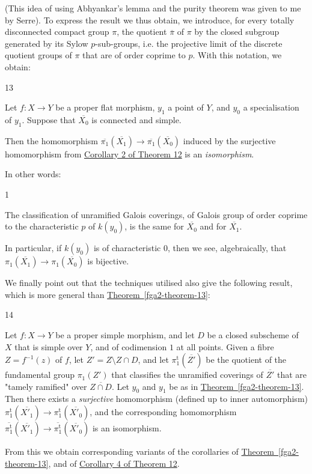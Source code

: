   (This idea of using Abhyankar's lemma and the purity theorem was given to me by Serre).
  To express the result we thus obtain, we introduce, for every totally disconnected compact group \(\pi \), the quotient \(\overline {\pi }\) of \(\pi \) by the closed subgroup generated by its Sylow \(p\)-sub-groups, i.e. the projective limit of the discrete quotient groups of \(\pi \) that are of order coprime to \(p\).
  With this notation, we obtain:\begin{theorem}{13}\label{fga2-theorem-13}\skipsinglepar\par{}Let \(f\colon  X\to  Y\) be a proper flat morphism, \(y_1\) a point of \(Y\), and \(y_0\) a specialisation of \(y_1\).
    Suppose that \(\overline {X_0}\) is connected and simple.
    
    Then the homomorphism \(\overline {\pi _1}(\overline {X_1})\to \overline {\pi _1}(\overline {X_0})\) induced by the
    surjective homomorphism from \hyperref[fga2-theorem-12-corollary-2]{Corollary 2 of Theorem 12} is an \emph{isomorphism}.\end{theorem}\par{}In other words:\begin{corollary}{1}\label{fga2-theorem-13-corollary-1}\skipsinglepar\par{}The classification of unramified Galois coverings, of Galois group of order coprime to the characteristic \(p\) of \(k(y_0)\), is the same for \(\overline {X_0}\) and for \(\overline {X_1}\).\end{corollary}\par{}In particular, if \(k(y_0)\) is of characteristic \(0\), then we see, algebraically, that \(\pi _1(\overline {X_1})\to \pi _1(\overline {X_0})\) is bijective.\par{}We finally point out that the techniques utilised also give the following result, which is more general than \hyperref[fga2-theorem-13]{Theorem~\ref*{fga2-theorem-13}}:\begin{theorem}{14}\label{fga2-theorem-14}\skipsinglepar\par{}Let \(f\colon  X\to  Y\) be a proper simple morphism, and let \(D\) be a closed subscheme of \(X\) that is simple over \(Y\), and of codimension \(1\) at all points.
    Given a fibre \(Z=f^{-1}(z)\) of \(f\), let \(Z'=Z\setminus  Z\cap  D\), and let \(\pi _1^\mathrm {t}(\overline {Z'})\) be the quotient of the fundamental group \(\pi _1(Z')\) that classifies the unramified coverings of \(\overline {Z'}\) that are "tamely ramified" over \(\overline {Z\cap  D}\).
    Let \(y_0\) and \(y_1\) be as in \hyperref[fga2-theorem-13]{Theorem~\ref*{fga2-theorem-13}}.
    Then there exists a \emph{surjective} homomorphism (defined up to inner automorphism) \(\pi _1^\mathrm {t}(\overline {X'_1})\to \pi _1^\mathrm {t}(\overline {X'_0})\), and the corresponding homomorphism \(\overline {\pi _1^\mathrm {t}}(\overline {X'_1})\to \overline {\pi _1^\mathrm {t}}(\overline {X'_0})\) is an isomorphism.\end{theorem}\par{}From this we obtain corresponding variants of the corollaries of \hyperref[fga2-theorem-13]{Theorem~\ref*{fga2-theorem-13}}, and of \hyperref[fga2-theorem-12-corollary-4]{Corollary 4 of Theorem 12}.
